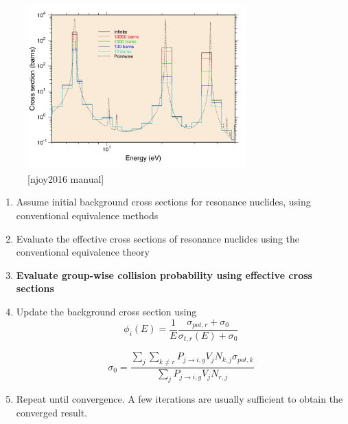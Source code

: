 \documentclass{beamer}
\begin{document}
\begin{frame}
\begin{figure}
\includegraphics[width=0.75\textwidth]{njoyGroupr}
  \caption{[njoy2016 manual]}
\end{figure}
\end{frame}




    \begin{frame}
      \begin{enumerate}
        \item Assume initial background cross sections for resonance nuclides, using conventional equivalence methods
        \item Evaluate the effective cross sections of resonance nuclides using the conventional equivalence theory
        \item \textbf{Evaluate group-wise collision probability using effective cross sections }
        \item Update the background cross section using
\begin{equation*}\phi_i(E)=\frac{1}{E}\frac{\sigma_{pot,r}+\sigma_{0}}{\sigma_{t,r}(E)+\sigma_{0}}\end{equation*}

\begin{equation*}\sigma_{0}=\frac{\sum\limits_j\sum\limits_{k\neq r}P_{j\rightarrow i,g}V_{j}N_{k,j}\sigma_{pot,k}}{\sum\limits_jP_{j\rightarrow i,g}V_{j}N_{r,j}}\end{equation*}


        \item Repeat until convergence. A few iterations are usually sufficient to obtain the converged result.
      \end{enumerate}
\end{frame}
\end{document}
